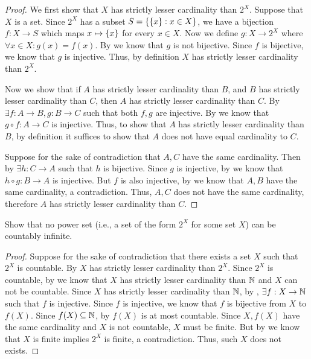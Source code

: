 \begin{proof}
  We first show that \(X\) has strictly lesser cardinality than \(2^X\).
  Suppose that \(X\) is a set.
  Since \(2^X\) has a subset \(S = \left\lbrace\left\lbrace x\right\rbrace : x \in X\right\rbrace\), we have a bijection \(f : X \to S\) which maps \(x \mapsto \left\lbrace x\right\rbrace\) for every \(x \in X\).
  Now we define \(g : X \to 2^X\) where \(\forall x \in X : g(x) = f(x)\).
  By  we know that \(g\) is not bijective.
  Since \(f\) is bijective, we know that \(g\) is injective.
  Thus, by definition \(X\) has strictly lesser cardinality than \(2^X\).

  Now we show that if \(A\) has strictly lesser cardinality than \(B\), and \(B\) has strictly lesser cardinality than \(C\), then \(A\) has strictly lesser cardinality than \(C\).
  By  \(\exists f : A \to B, g : B \to C\) such that both \(f, g\) are injective.
  By  we know that \(g \circ f : A \to C\) is injective.
  Thus, to show that \(A\) has strictly lesser cardinality than \(B\), by definition it suffices to show that \(A\) does not have equal cardinality to \(C\).

  Suppose for the sake of contradiction that \(A, C\) have the same cardinality.
  Then by  \(\exists h : C \to A\) such that \(h\) is bijective.
  Since \(g\) is injective, by  we know that \(h \circ g : B \to A\) is injective.
  But \(f\) is also injective, by  we know that \(A, B\) have the same cardinality, a contradiction.
  Thus, \(A, C\) does not have the same cardinality, therefore \(A\) has strictly lesser cardinality than \(C\).
\end{proof}

\begin{ex}\label{i:ex:8.3.5}
  Show that no power set (i.e., a set of the form \(2^X\) for some set \(X\)) can be countably infinite.
\end{ex}

\begin{proof}
  Suppose for the sake of contradiction that there exists a set \(X\) such that \(2^X\) is countable.
  By  \(X\) has strictly lesser cardinality than \(2^X\).
  Since \(2^X\) is countable, by  we know that \(X\) has strictly lesser cardinality than \(\mathbb{N}\) and \(X\) can not be countable.
  Since \(X\) has strictly lesser cardinality than \(\mathbb{N}\), by , \(\exists f : X \to \mathbb{N}\) such that \(f\) is injective.
  Since \(f\) is injective, we know that \(f\) is bijective from \(X\) to \(f(X)\).
  Since \(f(X) \subseteq \mathbb{N}\), by  \(f(X)\) is at most countable.
  Since \(X, f(X)\) have the same cardinality and \(X\) is not countable, \(X\) must be finite.
  But by  we know that \(X\) is finite implies \(2^X\) is finite, a contradiction.
  Thus, such \(X\) does not exists.
\end{proof}

